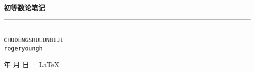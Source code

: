 \documentclass[cn,11pt,blue,normal,founder]{elegantbook}
\begin{document}
\newcommand\mfrac[2]{\dfrac{#1\smash[b]{\strut}}{#2\smash[t]{\strut}}}
\newcommand\RR{\mathbb{R}}
\newcommand\NN{\mathbb{N}}
\newcommand\QQ{\mathbb{Q}}
\newcommand\ee{\mathrm{e}}
\newcommand\dd{\mathrm{d}}
\newcommand\uppi{\mathrm{\pi}}
\newcommand\num[1]{{\textit{（}}{\rm{#1}}{\textit{）}}}

\begin{titlepage}
    \vspace*{25ex}%
    \begin{minipage}{.9\textwidth}
    \flushright
        {\textbf{初等数论笔记}}\\%
        \rule{\linewidth}{1pt}\\ \vspace{2ex}
        {\texttt{CHUDENGSHULUNBIJI}} \\%
        \vspace{20ex}%
        {\texttt{rogeryoungh}}%
    \end{minipage}
    \vfill\centering
    {\number\year 年 \number\month 月 \number\day 日 · \LaTeX{}}
\end{titlepage}
\clearpage{\hypersetup{hidelinks}\tableofcontents}

\clearpage

\end{document}
